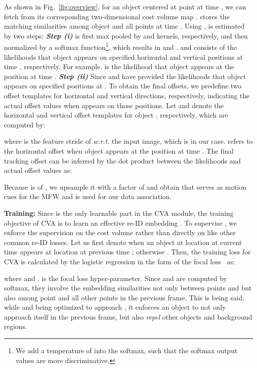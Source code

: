 \documentclass[final]{cvpr}
\newcommand{\myparagraph}[1]{{\vspace{0.5em} \noindent \bf #1}}
\begin{document}
As shown in Fig.~\ref{fig:overview}, for an object  centered at point  at time , we can fetch from  its corresponding two-dimensional cost volume map .  stores the matching similarities among object  and all points at time . Using ,  is estimated by two steps: 
\textbf{\emph{Step (i)}}  is first max pooled by  and  kernels, respectively, and then normalized by a softmax function\footnote{We add a temperature of  into the softmax, such that the softmax output values are more discriminative.}, which results in  and .  and  consists of the likelihoods that object  appears on specified horizontal and vertical positions at time , respectively. For example,  is the likelihood that object  appears at the position  at time . 
\textbf{\emph{Step (ii)}} Since  and  have provided the likelihoods that object  appears on specified positions at . To obtain the final offsets, we predefine two offset templates for horizontal and vertical directions, respectively, indicating the actual offset values when  appears on those positions. Let  and  denote the horizontal and vertical offset templates for object , respectively, which are computed by:
\vspace{-2mm}

where  is the feature stride of  \emph{w.r.t.} the input image, which is  in our case.  refers to the horizontal offset when object  appears at the position  at time . 
The final tracking offset can be inferred by the dot product between the likelihoods and actual offset values as:
\vspace{-1mm}

Because  is of , we upsample it with a factor of  and obtain  that serves as motion cues for the MFW and is used for our data association.

\myparagraph{Training:} Since  is the only learnable part in the CVA module, the training objective of CVA is to learn an effective re-ID embedding . To supervise , we enforce the supervision on the cost volume rather than directly on  like other common re-ID losses. Let us first denote  when an object at location  at current time  appears at location  at previous time ; otherwise . Then, the training loss for CVA is calculated by the logistic regression in the form of the focal loss~\cite{lin2017focal} as:
\vspace{-2mm}

where  and .  is the focal loss hyper-parameter. 
Since  and  are computed by softmax, they involve the embedding similarities not only between points  and  but also among point  and all other points in the previous frame. This is being said, while  and  being optimized to approach , it enforces an object to not only approach itself in the previous frame, but also \emph{repel} other objects and background regions.
\end{document}
